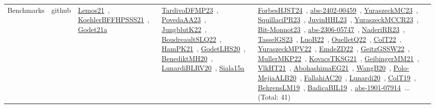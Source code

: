 {\begin{longtable}{lp{3cm}>{\raggedright\arraybackslash}p{6cm}>{\raggedright\arraybackslash}p{6cm}>{\raggedright\arraybackslash}p{8cm}}
Benchmarks & github & \href{works/Lemos21.pdf}{Lemos21}~\cite{Lemos21}, \href{works/KoehlerBFFHPSSS21.pdf}{KoehlerBFFHPSSS21}~\cite{KoehlerBFFHPSSS21}, \href{works/Godet21a.pdf}{Godet21a}~\cite{Godet21a} & \href{works/TardivoDFMP23.pdf}{TardivoDFMP23}~\cite{TardivoDFMP23}, \href{works/PovedaAA23.pdf}{PovedaAA23}~\cite{PovedaAA23}, \href{works/JungblutK22.pdf}{JungblutK22}~\cite{JungblutK22}, \href{works/BoudreaultSLQ22.pdf}{BoudreaultSLQ22}~\cite{BoudreaultSLQ22}, \href{works/HamPK21.pdf}{HamPK21}~\cite{HamPK21}, \href{works/GodetLHS20.pdf}{GodetLHS20}~\cite{GodetLHS20}, \href{works/BenediktMH20.pdf}{BenediktMH20}~\cite{BenediktMH20}, \href{works/LunardiBLRV20.pdf}{LunardiBLRV20}~\cite{LunardiBLRV20}, \href{works/Siala15a.pdf}{Siala15a}~\cite{Siala15a} & \href{works/ForbesHJST24.pdf}{ForbesHJST24}~\cite{ForbesHJST24}, \href{works/abs-2402-00459.pdf}{abs-2402-00459}~\cite{abs-2402-00459}, \href{works/YuraszeckMC23.pdf}{YuraszeckMC23}~\cite{YuraszeckMC23}, \href{works/SquillaciPR23.pdf}{SquillaciPR23}~\cite{SquillaciPR23}, \href{works/JuvinHHL23.pdf}{JuvinHHL23}~\cite{JuvinHHL23}, \href{works/YuraszeckMCCR23.pdf}{YuraszeckMCCR23}~\cite{YuraszeckMCCR23}, \href{works/Bit-Monnot23.pdf}{Bit-Monnot23}~\cite{Bit-Monnot23}, \href{works/abs-2306-05747.pdf}{abs-2306-05747}~\cite{abs-2306-05747}, \href{works/NaderiRR23.pdf}{NaderiRR23}~\cite{NaderiRR23}, \href{works/TasselGS23.pdf}{TasselGS23}~\cite{TasselGS23}, \href{works/LuoB22.pdf}{LuoB22}~\cite{LuoB22}, \href{works/OuelletQ22.pdf}{OuelletQ22}~\cite{OuelletQ22}, \href{works/ColT22.pdf}{ColT22}~\cite{ColT22}, \href{works/YuraszeckMPV22.pdf}{YuraszeckMPV22}~\cite{YuraszeckMPV22}, \href{works/EmdeZD22.pdf}{EmdeZD22}~\cite{EmdeZD22}, \href{works/GeitzGSSW22.pdf}{GeitzGSSW22}~\cite{GeitzGSSW22}, \href{works/MullerMKP22.pdf}{MullerMKP22}~\cite{MullerMKP22}, \href{works/KovacsTKSG21.pdf}{KovacsTKSG21}~\cite{KovacsTKSG21}, \href{works/GeibingerMM21.pdf}{GeibingerMM21}~\cite{GeibingerMM21}, \href{works/VlkHT21.pdf}{VlkHT21}~\cite{VlkHT21}, \href{works/AbohashimaEG21.pdf}{AbohashimaEG21}~\cite{AbohashimaEG21}, \href{works/WangB20.pdf}{WangB20}~\cite{WangB20}, \href{works/Polo-MejiaALB20.pdf}{Polo-MejiaALB20}~\cite{Polo-MejiaALB20}, \href{works/FallahiAC20.pdf}{FallahiAC20}~\cite{FallahiAC20}, \href{works/Lunardi20.pdf}{Lunardi20}~\cite{Lunardi20}, \href{works/ColT19.pdf}{ColT19}~\cite{ColT19}, \href{works/BehrensLM19.pdf}{BehrensLM19}~\cite{BehrensLM19}, \href{works/BadicaBIL19.pdf}{BadicaBIL19}~\cite{BadicaBIL19}, \href{works/abs-1901-07914.pdf}{abs-1901-07914}~\cite{abs-1901-07914}... (Total: 41)\\

\end{longtable}}
